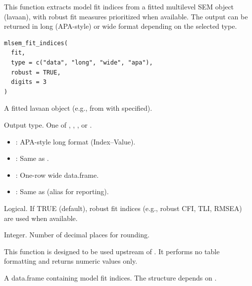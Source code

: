 \documentclass[a4paper]{book}
\begin{document}
%
\begin{Description}
This function extracts model fit indices from a fitted
multilevel SEM object (lavaan), with robust fit measures prioritized
when available. The output can be returned in long (APA-style) or
wide format depending on the selected type.
\end{Description}
%
\begin{Usage}
\begin{verbatim}
mlsem_fit_indices(
  fit,
  type = c("data", "long", "wide", "apa"),
  robust = TRUE,
  digits = 3
)
\end{verbatim}
\end{Usage}
%
\begin{Arguments}
\begin{ldescription}
\item[\code{fit}] A fitted lavaan object (e.g., from  with
 specified).

\item[\code{type}] Output type.
One of , , , or .
\begin{itemize}

\item{} : APA-style long format (Index–Value).
\item{} : Same as .
\item{} : One-row wide data.frame.
\item{} : Same as  (alias for reporting).

\end{itemize}


\item[\code{robust}] Logical. If TRUE (default), robust fit indices
(e.g., robust CFI, TLI, RMSEA) are used when available.

\item[\code{digits}] Integer. Number of decimal places for rounding.
\end{ldescription}
\end{Arguments}
%
\begin{Details}
This function is designed to be used upstream of
.
It performs no table formatting and returns numeric values only.
\end{Details}
%
\begin{Value}
A data.frame containing model fit indices.
The structure depends on .
\end{Value}
\end{document}
